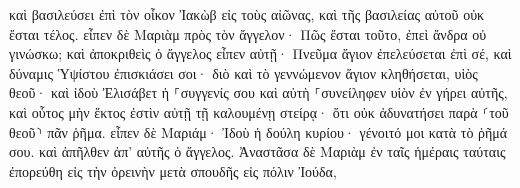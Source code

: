 \documentclass{openreader}
\begin{document}
καὶ βασιλεύσει ἐπὶ τὸν οἶκον Ἰακὼβ εἰς τοὺς αἰῶνας, καὶ τῆς βασιλείας αὐτοῦ οὐκ ἔσται τέλος. 
εἶπεν δὲ Μαριὰμ πρὸς τὸν ἄγγελον· Πῶς ἔσται τοῦτο, ἐπεὶ ἄνδρα οὐ γινώσκω; 
καὶ ἀποκριθεὶς ὁ ἄγγελος εἶπεν αὐτῇ· Πνεῦμα ἅγιον ἐπελεύσεται ἐπὶ σέ, καὶ δύναμις Ὑψίστου ἐπισκιάσει σοι· διὸ καὶ τὸ γεννώμενον ἅγιον κληθήσεται, υἱὸς θεοῦ· 
καὶ ἰδοὺ Ἐλισάβετ ἡ ⸀συγγενίς σου καὶ αὐτὴ ⸀συνείληφεν υἱὸν ἐν γήρει αὐτῆς, καὶ οὗτος μὴν ἕκτος ἐστὶν αὐτῇ τῇ καλουμένῃ στείρᾳ· 
ὅτι οὐκ ἀδυνατήσει παρὰ ⸂τοῦ θεοῦ⸃ πᾶν ῥῆμα. 
εἶπεν δὲ Μαριάμ· Ἰδοὺ ἡ δούλη κυρίου· γένοιτό μοι κατὰ τὸ ῥῆμά σου. καὶ ἀπῆλθεν ἀπ’ αὐτῆς ὁ ἄγγελος. 
Ἀναστᾶσα δὲ Μαριὰμ ἐν ταῖς ἡμέραις ταύταις ἐπορεύθη εἰς τὴν ὀρεινὴν μετὰ σπουδῆς εἰς πόλιν Ἰούδα, 
\end{document}
